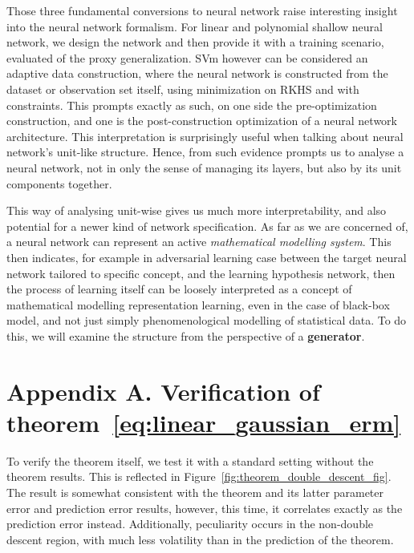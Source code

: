 \documentclass[10pt]{article} %
\begin{document}
Those three fundamental conversions to neural network raise interesting insight into the neural network formalism. For linear and polynomial shallow neural network, we design the network and then provide it with a training scenario, evaluated of the proxy generalization. SVm however can be considered an adaptive data construction, where the neural network is constructed from the dataset or observation set itself, using minimization on RKHS and with constraints. This prompts exactly as such, on one side the pre-optimization construction, and one is the post-construction optimization of a neural network architecture. This interpretation is surprisingly useful when talking about neural network's unit-like structure. Hence, from such evidence prompts us to analyse a neural network, not in only the sense of managing its layers, but also by its unit components together. 

This way of analysing unit-wise gives us much more interpretability, and also potential for a newer kind of network specification. As far as we are concerned of, a neural network can represent an active \textit{mathematical modelling system}. This then indicates, for example in adversarial learning case between the target neural network tailored to specific concept, and the learning hypothesis network, then the process of learning itself can be loosely interpreted as a concept of mathematical modelling representation learning, even in the case of black-box model, and not just simply phenomenological modelling of statistical data. To do this, we will examine the structure from the perspective of a \textbf{generator}.



\clearpage




\clearpage

\appendix
\section*{Appendix A. Verification of theorem~\ref{eq:linear_gaussian_erm}}

To verify the theorem itself, we test it with a standard setting without the theorem results. This is reflected in Figure~\ref{fig:theorem_double_descent_fig}. The result is somewhat consistent with the theorem and its latter parameter error and prediction error results, however, this time, it correlates exactly as the prediction error instead. Additionally, peculiarity occurs in the non-double descent region, with much less volatility than in the prediction of the theorem. 
\end{document}
